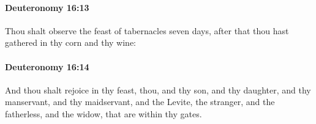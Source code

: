 		\paragraph{Deuteronomy 16:13} %
			\label{DEUTERONOMY-16-13}

			Thou shalt observe the feast of tabernacles seven days, after that thou hast gathered in thy corn and thy wine:


		\paragraph{Deuteronomy 16:14} %
			\label{DEUTERONOMY-16-14}

			And thou shalt rejoice in thy feast, thou, and thy son, and thy daughter, and thy manservant, and thy maidservant, and the Levite, the stranger, and the fatherless, and the widow, that are within thy gates.



